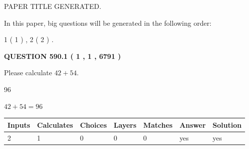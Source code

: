 \documentclass[12pt]{article}
\begin{document}
   
   
   
   
   
 \vspace{0.2in}
 
 
 
 
   
   
 PAPER TITLE GENERATED.
   
   
   
\vspace{0.2in}
   
In this paper, big questions will be generated in the following order: 
   
   
   1 ( 1 )
 ,
   2 ( 2 )
 .
  
\vspace{0.2in}
  
{\textbf{\Large{QUESTION
590.1 
 ( 1 , 1 , 6791 )
}}}
  
  
 
Please calculate $ %
42 +  %
54 $.
 
 
 
\noindent{}
 
 

96
 
 
\noindent{}
 
 

 
 
 
\noindent{}
 
 

$ %
42 +  %
54=   %
96$
 
 
\noindent{}
 
 

 
   
   
   
   
\noindent\begin{tabular}{|l|l|l|l|l|l|l|}
 \hline
Inputs & Calculates & Choices & Layers & Matches & Answer & Solution \\ \hline
 2  & 
 1  & 
 0
  & 
 0  & 
 0  & 
  yes & 
  yes 
  \\ \hline
 \end{tabular}
   
   
   
   
\noindent{}
   
\end{document}
